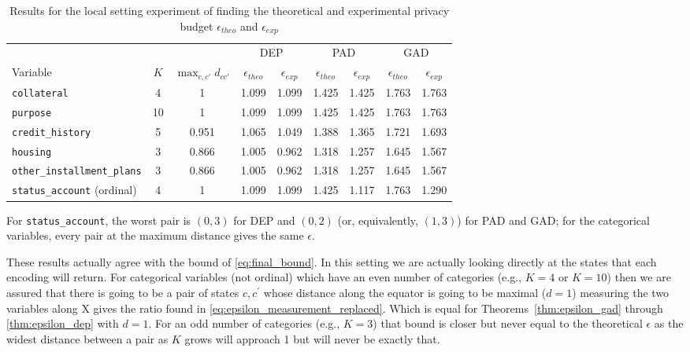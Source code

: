 \documentclass{ieeeaccess}
\begin{document}
\begin{table}[!t]
  \caption{Results for the local setting experiment of finding the theoretical and experimental privacy budget $\epsilon_{theo}$ and $\epsilon_{exp}$}
  \label{tab:local_results}
  \centering
  \begin{tabular}{lcccccccc}
    \toprule
    & & & \multicolumn{2}{c}{DEP} & \multicolumn{2}{c}{PAD} & \multicolumn{2}{c}{GAD} \\
    \cmidrule(lr){4-5} \cmidrule(lr){6-7} \cmidrule(l){8-9}
    Variable & $K$ & $\max_{c,c'} d_{cc'}$ & $\epsilon_{theo}$ & $\epsilon_{exp}$ & $\epsilon_{theo}$ & $\epsilon_{exp}$ & $\epsilon_{theo}$ & $\epsilon_{exp}$ \\
    \midrule
    \texttt{collateral}                        & 4  & 1     & 1.099 & 1.099 & 1.425 & 1.425 & 1.763 & 1.763 \\
    \texttt{purpose}                           & 10 & 1     & 1.099 & 1.099 & 1.425 & 1.425 & 1.763 & 1.763 \\
    \texttt{credit\_history}                   & 5  & 0.951 & 1.065 & 1.049 & 1.388 & 1.365 & 1.721 & 1.693 \\
    \texttt{housing}                           & 3  & 0.866 & 1.005 & 0.962 & 1.318 & 1.257 & 1.645 & 1.567 \\
    \texttt{other\_installment\_plans}         & 3  & 0.866 & 1.005 & 0.962 & 1.318 & 1.257 & 1.645 & 1.567 \\
    \texttt{status\_account} (ordinal)         & 4  & 1     & 1.099 & 1.099 & 1.425 & 1.117 & 1.763 & 1.290 \\
    \bottomrule
  \end{tabular}
  \par\smallskip
  {\footnotesize For \texttt{status\_account}, the worst pair is $(0,3)$ for DEP and $(0,2)$ (or, equivalently, $(1,3)$) for PAD and GAD; for the categorical variables, every pair at the maximum distance gives the same $\epsilon$.\par}
\end{table}

These results actually agree with the bound of \eqref{eq:final_bound}. In this setting we are actually looking directly at the states that each encoding will return. For categorical variables (not ordinal) which have an even number of categories (e.g., $K=4$ or $K=10$) then we are assured that there is going to be a pair of states $c, c^{\prime}$ whose distance along the equator is going to be maximal ($d=1$) measuring the two variables along X gives the ratio found in \eqref{eq:epsilon_measurement_replaced}. Which is equal for Theorems~\ref{thm:epsilon_gad} through \ref{thm:epsilon_dep} with $d=1$. For an odd number of categories (e.g., $K=3$) that bound is closer but never equal to the theoretical $\epsilon$ as the widest distance between a pair as $K$ grows will approach 1 but will never be exactly that.
\end{document}
